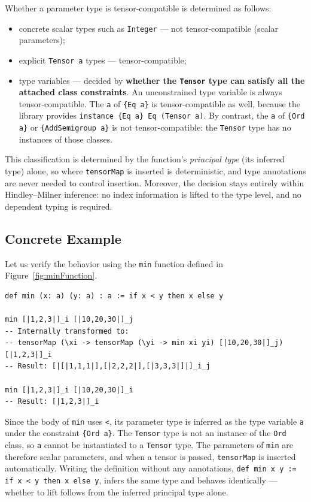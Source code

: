 Whether a parameter type is tensor-compatible is determined as follows:
\begin{itemize}
\item concrete scalar types such as \lstinline{Integer} --- not tensor-compatible (scalar parameters);
\item explicit \lstinline{Tensor a} types --- tensor-compatible;
\item type variables --- decided by \textbf{whether the \lstinline{Tensor} type can satisfy all the attached class constraints}.
An unconstrained type variable is always tensor-compatible.
The \lstinline{a} of \lstinline|{Eq a}| is tensor-compatible as well, because the library provides \lstinline|instance {Eq a} Eq (Tensor a)|.
By contrast, the \lstinline{a} of \lstinline|{Ord a}| or \lstinline|{AddSemigroup a}| is not tensor-compatible: the \lstinline{Tensor} type has no instances of those classes.
\end{itemize}
This classification is determined by the function's \emph{principal type} (its inferred type) alone, so where \lstinline{tensorMap} is inserted is deterministic, and type annotations are never needed to control insertion.
Moreover, the decision stays entirely within Hindley--Milner inference: no index information is lifted to the type level, and no dependent typing is required.

\subsection{Concrete Example}

Let us verify the behavior using the \lstinline{min} function defined in Figure~\ref{fig:minFunction}.
\begin{lstlisting}[language=egison,numbers=none]
def min (x: a) (y: a) : a := if x < y then x else y

min [|1,2,3|]_i [|10,20,30|]_j
-- Internally transformed to:
-- tensorMap (\xi -> tensorMap (\yi -> min xi yi) [|10,20,30|]_j) [|1,2,3|]_i
-- Result: [|[|1,1,1|],[|2,2,2|],[|3,3,3|]|]_i_j

min [|1,2,3|]_i [|10,20,30|]_i
-- Result: [|1,2,3|]_i
\end{lstlisting}

Since the body of \lstinline{min} uses \lstinline{<}, its parameter type is inferred as the type variable \lstinline{a} under the constraint \lstinline|{Ord a}|.
The \lstinline{Tensor} type is not an instance of the \lstinline{Ord} class, so \lstinline{a} cannot be instantiated to a \lstinline{Tensor} type.
The parameters of \lstinline{min} are therefore scalar parameters, and when a tensor is passed, \lstinline{tensorMap} is inserted automatically.
Writing the definition without any annotations, \lstinline{def min x y := if x < y then x else y}, infers the same type and behaves identically --- whether to lift follows from the inferred principal type alone.

